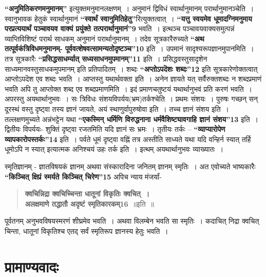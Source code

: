 {\textbf{“अनुमितिकरणमनुमानम्”} इत्युक्तमनुमानलक्षणम्~। अनुमानं द्विविधं स्वार्थानुमानम् परार्थानुमानञ्चेति~। स्वानुभावक हेतुकं स्वार्थानुमानं \textbf{“स्वार्थं स्वानुमितिहेतु”}रित्युक्तत्वात्~। \textbf{“यत्तु स्वयमेव धूमादग्निमनुमाय परप्रत्ययार्थं पञ्चावयव वाक्यं प्रयुंक्ते तत्परार्थानुमानं”9} भवति~। इत्थञ्च पञ्चावयवाक्यसमुत्पन्नं व्याप्तिविशिष्टं परार्थ साधकम् अनुमानं परार्थानुमानम्~। तदेव सूत्रकारैरुच्यते \textbf{“अथ तत्पूर्वकंत्रिविधमनुमानम्- पूर्ववत्शेषवत्सामन्यतोदृष्टञ्च”10} इति~। उपमानं सादृश्यरूपज्ञानमुपानमिति~। तत्र सूत्रकारैः \textbf{“प्रसिद्धसाधर्म्यात् सध्यसाधनमुपमानम्”11} इति~। प्रसिद्धवस्तुसादृशेन साध्यमानवस्तुसाधकमुपमानम् इति प्रतिपादितम्~। शब्दः \textbf{“अप्तोऽपदॆशः शब्दः”12} इति सूत्रकारेणोक्तत्वात् आप्तोऽपदॆश एव शब्दः भवति~। आप्तस्तु यथार्थवक्ता इति~। अनेन ज्ञायते यत् सर्वैरुक्तशब्दः न शब्दप्रमाणं भवति अपि तु आप्तोक्त शब्द एव शब्दप्रमाणमिति~। इदं प्रमाणचतुष्टयं यथार्थानुभवं प्रति करणं भवति~। अपरस्तु अयथार्थानुभवः~। सः त्रिविधः संशयविपर्यय(भ्रम)तर्कश्चेति~। प्रथमः संशयः~। पुरुषः गच्छन् सन् दूरस्थं वस्तु दृष्ट्वा तस्य ज्ञानं जायते, अयं स्थाणुर्वा\break पुरुषोवा इति~। तच्च ज्ञानं संशय इति~। तल्लक्षणमुच्यते अन्नंभट्टेन यथा \textbf{“एकस्मिन् धर्मिणि विरुद्धनाना धर्मवैशिष्ट्यावगाहि ज्ञानं संशय”13} इति~। द्वितीयः विपर्ययः- शुक्तिं दृष्ट्वा रजतमिति यदि ज्ञानं सः भ्रमः~। तृतीयः तर्कः – \textbf{“व्याप्यारोपेण व्यापकारोपस्तर्कः”14} इति~। पर्वते धूमं दृष्ट्वा वह्निं तत्र अस्तीति साध्यते यथा यदि वन्हिर्न स्यात् तर्हि धूमोऽपि न स्यात् इत्यात्मक अनिश्चयं उहः तर्क इति~। इत्थम् अयथार्थानुभवः व्याख्यातः~। 

स्मृतिज्ञानम् - ज्ञातविषयकं ज्ञानम् अथवा संस्कारादिना जनितम् ज्ञानम् स्मृतिः~। अत एवोच्यते भाष्यकारैः \textbf{“किञ्चित् क्षिप्रं स्मर्यते किञ्चित् चिरेण”15} अपिच न्याय मंजर्यां-
\begin{verse}
\textbf{क्वचिन्निद्रा क्वचिच्चिन्ता धातूनां विकृतिः क्वचित्~। \\
अलक्षमाणे तद्धातौ अदृष्टं स्मृतिकारकम्16}~॥इति~॥
\end{verse}
पूर्वतनम् अनुभवविषयस्मरणं शीघ्रमेव भवति~। अथवा विलम्बेन भवति सा स्मृतिः~। कदाचित् निद्रा क्वचित् चिन्ता, धातूनां विकृतिश्च एतद् सर्वं स्मृतिरूप ज्ञानस्य हेतुः भवति~। 

\section*{प्रामाण्यवादः}

}
